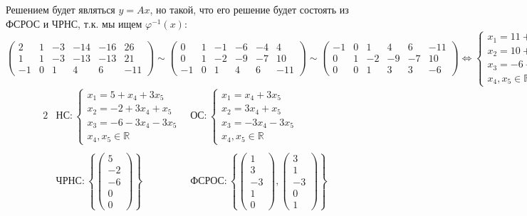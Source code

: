\documentclass{article}
\begin{document}
\begin{center}
Решением будет являться $y = Ax$, но такой, что его решение будет состоять из ФСРОС и ЧРНС, т.к. мы ищем $\varphi^{-1}(x)$:
$$\left(\begin{array}{rrrrr|r}
2 & 1 & -3 & -14 & -16 & 26 \\ 1 & 1 & -3 & -13 & -13 & 21 \\ -1 & 0 & 1 & 4 & 6 & -11
\end{array}\right) \sim \left(\begin{array}{rrrrr|r}
0 & 1 & -1 & -6 & -4 & 4 \\ 0 & 1 & -2 & -9 & -7 & 10 \\ -1 & 0 & 1 & 4 & 6 & -11
\end{array}\right) \sim \left(\begin{array}{rrrrr|r}
-1 & 0 & 1 & 4 & 6 & -11 \\ 0 & 1 & -2 & -9 & -7 & 10  \\ 0 & 0 & 1 & 3 & 3 & -6
\end{array}\right)\Leftrightarrow \begin{cases}
x_1 = 11 + x_3 + 4x_4 + 6x_5 \\
x_2 = 10 + 2x_3 + 9x_4 + 7x_5 \\
x_3 = -6 -3x_4 - 3x_5 \\
x_4, x_5 \in \mathbb{R}
\end{cases}$$
\begin{alignat*}{2}
&НС: \begin{cases}
x_1 = 5 + x_4 + 3x_5 \\
x_2 = -2 + 3x_4 + x_5 \\
x_3 = -6 -3x_4 - 3x_5 \\
x_4, x_5 \in \mathbb{R}
\end{cases}& ОС: \begin{cases}
x_1 = x_4 + 3x_5 \\
x_2 = 3x_4 + x_5 \\
x_3 = -3x_4 - 3x_5 \\
x_4, x_5 \in \mathbb{R}
\end{cases} \\ \, \\
&ЧРНС: \left\{\begin{pmatrix}
5 \\ -2 \\ -6 \\ 0 \\ 0
\end{pmatrix}\right\}\qquad\qquad &ФСРОС: \left\{\begin{pmatrix}
1 \\ 3 \\ -3 \\ 1 \\ 0
\end{pmatrix}, \begin{pmatrix}
3 \\ 1 \\ -3 \\ 0 \\ 1
\end{pmatrix}\right\}
\end{alignat*} \\
\end{center}
\end{document}
